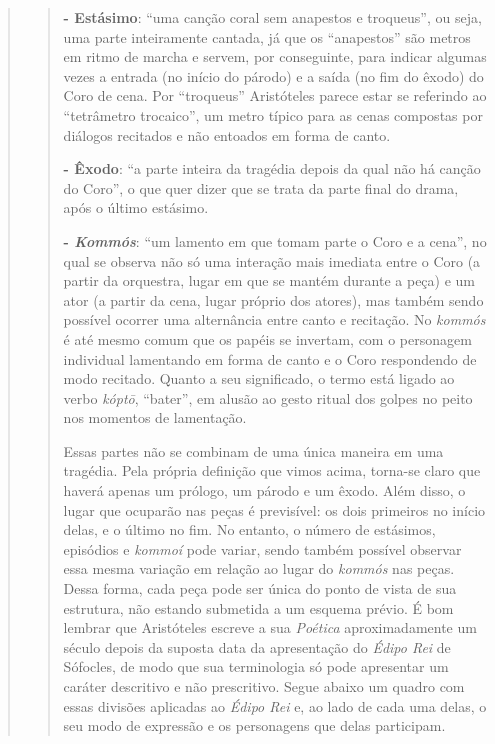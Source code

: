 \begin{verse}
\begin{verse}
\textbf{- Estásimo}: ``uma canção coral sem anapestos e troqueus'', ou
seja, uma parte inteiramente cantada, já que os ``anapestos'' são metros
em ritmo de marcha e servem, por conseguinte, para indicar algumas vezes
a entrada (no início do párodo) e a saída (no fim do êxodo) do Coro de
cena. Por ``troqueus'' Aristóteles parece estar se referindo ao
``tetrâmetro trocaico'', um metro típico para as cenas compostas por
diálogos recitados e não entoados em forma de canto.

\textbf{- Êxodo}: ``a parte inteira da tragédia depois da qual não há
canção do Coro'', o que quer dizer que se trata da parte final do drama,
após o último estásimo.

\textbf{- \emph{Kommós}}: ``um lamento em que tomam parte o Coro e a
cena'', no qual se observa não só uma interação mais imediata entre o
Coro (a partir da orquestra, lugar em que se mantém durante a peça) e um
ator (a partir da cena, lugar próprio dos atores), mas também sendo
possível ocorrer uma alternância entre canto e recitação. No
\emph{kommós} é até mesmo comum que os papéis se invertam, com o
personagem individual lamentando em forma de canto e o Coro respondendo
de modo recitado. Quanto a seu significado, o termo está ligado ao verbo
\emph{kóptō}, ``bater'', em alusão ao gesto ritual dos golpes no peito
nos momentos de lamentação.

Essas partes não se combinam de uma única maneira em uma tragédia. Pela
própria definição que vimos acima, torna-se claro que haverá apenas um
prólogo, um párodo e um êxodo. Além disso, o lugar que ocuparão nas
peças é previsível: os dois primeiros no início delas, e o último no
fim. No entanto, o número de estásimos, episódios e \emph{kommoí} pode
variar, sendo também possível observar essa mesma variação em relação ao
lugar do \emph{kommós} nas peças. Dessa forma, cada peça pode ser única
do ponto de vista de sua estrutura, não estando submetida a um esquema
prévio. É bom lembrar que Aristóteles escreve a sua \emph{Poética}
aproximadamente um século depois da suposta data da apresentação do
\emph{Édipo Rei} de Sófocles, de modo que sua terminologia só pode
apresentar um caráter descritivo e não prescritivo. Segue abaixo um
quadro com essas divisões aplicadas ao \emph{Édipo Rei} e, ao lado de
cada uma delas, o seu modo de expressão e os personagens que delas
participam.


\end{verse}
\end{verse}
